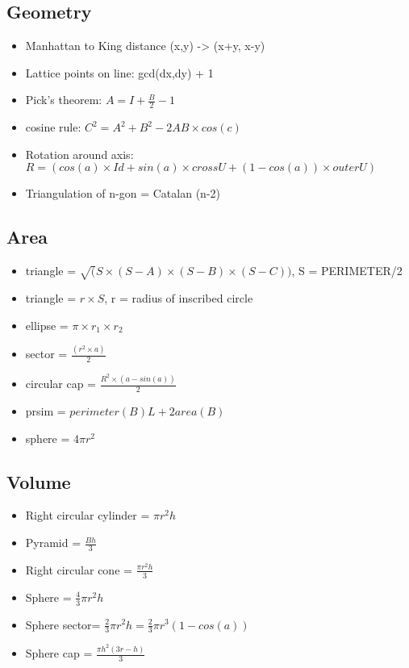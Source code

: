\subsection{Geometry}
\begin{itemize}
\item Manhattan to King distance (x,y) -> (x+y, x-y)
\item Lattice points on line: gcd(dx,dy) + 1
\item Pick's theorem: $A = I + \frac{B}{2} - 1$
\item cosine rule: $C^2=A^2+B^2-2AB \times cos(c)$
\item Rotation around axis: $R = (cos(a) \times Id + sin(a) \times cross U + (1 - cos(a)) \times outer U)$
\item Triangulation of n-gon = Catalan (n-2)
\end{itemize}
\hrulefill
\subsection{Area}
\begin{itemize}
\item triangle = $\sqrt(S \times (S-A) \times (S-B) \times (S-C))$, S = PERIMETER/2
\item triangle = $r \times S$, r = radius of inscribed circle
\item ellipse = $\pi \times r_1 \times r_2$
\item sector = $\frac{(r^2 \times a)}{2}$
\item circular cap = $\frac{R^2 \times (a-sin(a))}{2}$
\item prsim = $perimeter(B) L + 2 area(B)$
\item sphere = $4 \pi r^2$
\end{itemize}
\hrulefill
\subsection{Volume}
\begin{itemize}
\item Right circular cylinder = $\pi r^2 h$ 
\item Pyramid = $\frac{Bh}{3}$
\item Right circular cone = $\frac{\pi r^2 h}{3}$
\item Sphere = $\frac{4}{3} \pi r^2 h$
\item Sphere sector= $\frac{2}{3} \pi r^2h = \frac{2}{3} \pi r^3 (1-cos(a))$
\item Sphere cap = $\frac{\pi h^2 (3r-h)}{3}$
\end{itemize}
\hrulefill
